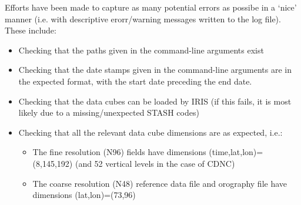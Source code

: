 \documentclass[10pt,a4paper]{article}
\begin{document}
Efforts have been made to capture as many potential errors as possibe in a `nice' manner (i.e. with descriptive erorr/warning messages written to the log file). These include:
\begin{itemize}
\item Checking that the paths given in the command-line arguments exist
\item Checking that the date stamps given in the command-line arguments are in the expected format, with the start date preceding the end date.
\item Checking that the data cubes can be loaded by IRIS (if this fails, it is most likely due to a missing/unexpected STASH codes)
\item Checking that all the relevant data cube dimensions are as expected, i.e.:
\begin{itemize}
\item The fine resolution (N96) fields have dimensions (time,lat,lon)=(8,145,192) (and 52 vertical levels in the case of CDNC)
\item The coarse resolution (N48) reference data file and orography file have dimensions (lat,lon)=(73,96)
\end{itemize}
\end{itemize}
\end{document}
